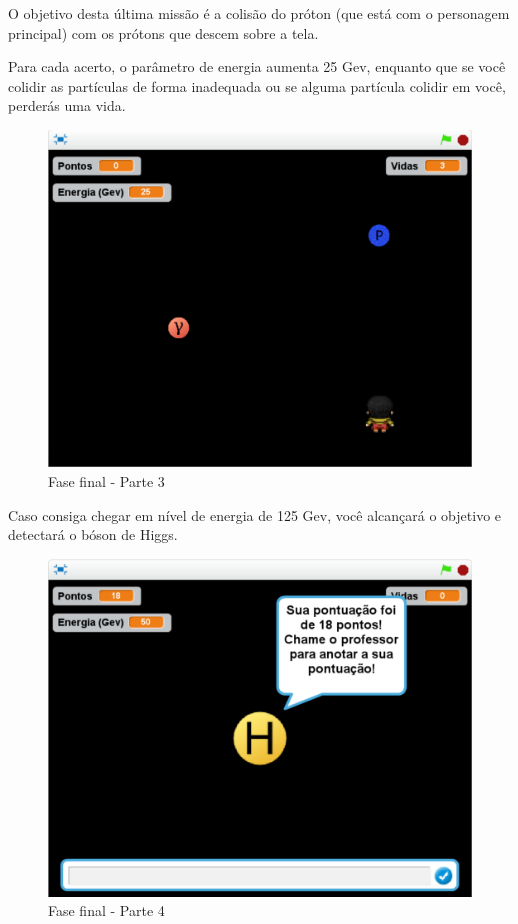 \documentclass[12pt,fleqn]{book} %
\begin{document}
O objetivo desta última missão é a colisão do próton (que está com o personagem principal) com os prótons que descem sobre a tela.

Para cada acerto, o parâmetro de energia aumenta 25 Gev, enquanto que se você colidir as partículas de forma inadequada ou se alguma partícula colidir em você, perderás uma vida.

\begin{figure}[h]
	\centering
	\includegraphics[width=0.65 \textwidth]{Produto/final3}
	\caption{Fase final - Parte 3}
	\label{fig:app_a:final3}
\end{figure}

\newpage

Caso consiga chegar em nível de energia de 125 Gev, você alcançará o objetivo e detectará o bóson de Higgs.

\begin{figure}[h]
	\centering
	\includegraphics[width=0.65 \textwidth]{Produto/final4}
	\caption{Fase final - Parte 4}
	\label{fig:app_a:final4}
\end{figure}




\end{document}
